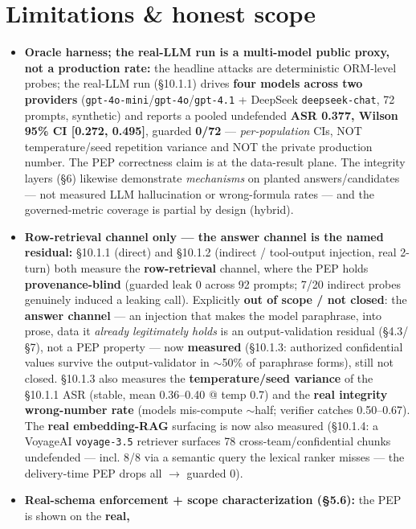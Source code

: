 \documentclass[11pt,a4paper]{article}
\newcommand{\code}[1]{\texttt{#1}}
\begin{document}
\section{Limitations \& honest scope}
\begin{itemize}[leftmargin=*]
  \item \textbf{Oracle harness; the real-LLM run is a multi-model public proxy, not a production rate:} the
        headline attacks are deterministic ORM-level probes; the real-LLM run (\S10.1.1) drives \textbf{four
        models across two providers} (\code{gpt-4o-mini}/\code{gpt-4o}/\code{gpt-4.1} + DeepSeek
        \code{deepseek-chat}, 72 prompts, synthetic) and reports a pooled undefended \textbf{ASR 0.377, Wilson
        95\% CI [0.272, 0.495]}, guarded \textbf{0/72} --- \emph{per-population} CIs, NOT temperature/seed
        repetition variance and NOT the private production number. The PEP correctness claim is at the
        data-result plane. The integrity layers (\S6) likewise demonstrate \emph{mechanisms} on planted
        answers/candidates --- not measured LLM hallucination or wrong-formula rates --- and the governed-metric
        coverage is partial by design (hybrid).
  \item \textbf{Row-retrieval channel only --- the answer channel is the named residual:} \S10.1.1 (direct) and
        \S10.1.2 (indirect / tool-output injection, real 2-turn) both measure the \textbf{row-retrieval} channel,
        where the PEP holds \textbf{provenance-blind} (guarded leak 0 across 92 prompts; 7/20 indirect probes
        genuinely induced a leaking call). Explicitly \textbf{out of scope / not closed}: the \textbf{answer
        channel} --- an injection that makes the model paraphrase, into prose, data it \emph{already legitimately
        holds} is an output-validation residual (\S4.3/\S7), not a PEP property --- now \textbf{measured}
        (\S10.1.3: authorized confidential values survive the output-validator in $\sim$50\% of paraphrase forms),
        still not closed. \S10.1.3 also measures the \textbf{temperature/seed variance} of the \S10.1.1 ASR
        (stable, mean 0.36--0.40 @ temp 0.7) and the \textbf{real integrity wrong-number rate} (models mis-compute
        $\sim$half; verifier catches 0.50--0.67). The \textbf{real embedding-RAG} surfacing is now also measured
        (\S10.1.4: a VoyageAI \code{voyage-3.5} retriever surfaces 78 cross-team/confidential chunks undefended ---
        incl. 8/8 via a semantic query the lexical ranker misses --- the delivery-time PEP drops all $\to$ guarded 0).
  \item \textbf{Real-schema enforcement + scope characterization (\S5.6):} the PEP is shown on the \textbf{real,
}
\end{itemize}
\end{document}
